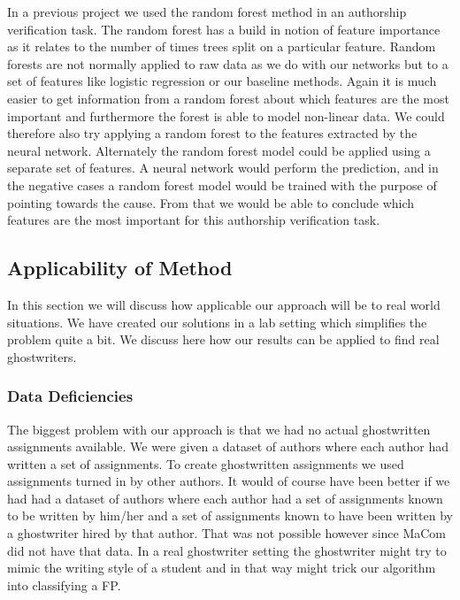 In a previous project \citep{US} we used the random forest method in an
authorship verification task. The random forest has a build in notion of feature
importance as it relates to the number of times trees split on a particular
feature. Random forests are not normally applied to raw data as we do with our
networks but to a set of features like logistic regression or our baseline
methods. Again it is much easier to get information from a random forest about
which features are the most important and furthermore the forest is able to
model non-linear data. We could therefore also try applying a random forest to
the features extracted by the neural network. Alternately the random forest
model could be applied using a separate set of features. A neural network would
perform the prediction, and in the negative cases a random forest model would
be trained with the purpose of pointing towards the cause. From that we would
be able to conclude which features are the most important for this authorship
verification task.


\subsection{Applicability of Method}\label{subsec:applicability_of_method}

In this section we will discuss how applicable our approach will be to real
world situations. We have created our solutions in a lab setting which
simplifies the problem quite a bit. We discuss here how our results can be
applied to find real ghostwriters.


\subsubsection{Data Deficiencies}

The biggest problem with our approach is that we had no actual ghostwritten
assignments available. We were given a dataset of authors where each author
had written a set of assignments. To create ghostwritten assignments we used
assignments turned in by other authors. It would of course have been better if
we had had a dataset of authors where each author had a set of assignments known
to be written by him/her and a set of assignments known to have been written by
a ghostwriter hired by that author. That was not possible however since MaCom
did not have that data. In a real ghostwriter setting the ghostwriter might
try to mimic the writing style of a student and in that way might trick our
algorithm into classifying a \gls{FP}.

